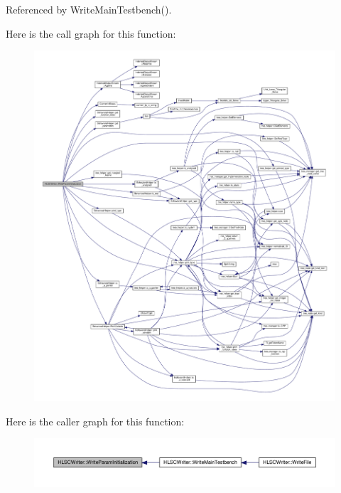 Referenced by Write\+Main\+Testbench().

Here is the call graph for this function\+:
\nopagebreak
\begin{figure}[H]
\begin{center}
\leavevmode
\includegraphics[width=350pt]{d4/db1/classHLSCWriter_ae9413ea7c35fc3eec7417fd0cf2a5b14_cgraph}
\end{center}
\end{figure}
Here is the caller graph for this function\+:
\nopagebreak
\begin{figure}[H]
\begin{center}
\leavevmode
\includegraphics[width=350pt]{d4/db1/classHLSCWriter_ae9413ea7c35fc3eec7417fd0cf2a5b14_icgraph}
\end{center}
\end{figure}
\mbox{\label{classHLSCWriter_a878ff97c2a1428574b641d4ef2704b76}} 
